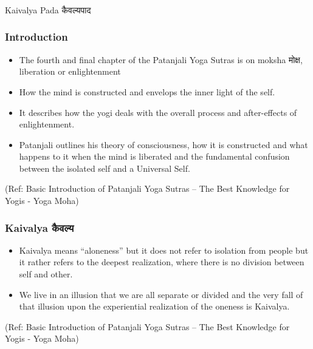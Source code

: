 \begin{frame}[fragile]\frametitle{}
\begin{center}
{\Large Kaivalya Pada कैवल्यपाद}
\end{center}
\end{frame}



\begin{frame}[fragile]\frametitle{Introduction}


	\begin{itemize}
	\item The fourth and final chapter of the Patanjali Yoga Sutras is on moksha मोक्ष, liberation or enlightenment
	\item How the mind is constructed and envelops the inner light of the self. 
	\item It describes how the yogi deals with the overall process and after-effects of enlightenment. 	\item Patanjali outlines his theory of consciousness, how it is constructed and what happens to it when the mind is liberated and the fundamental confusion between the isolated self and a Universal Self.
	\end{itemize}

\tiny{(Ref: Basic Introduction of Patanjali Yoga Sutras – The Best Knowledge for Yogis - Yoga Moha)}

\end{frame}

\begin{frame}[fragile]\frametitle{Kaivalya कैवल्य}


	\begin{itemize}
	\item Kaivalya means ``aloneness'' but it does not refer to isolation from people but it rather refers to the deepest realization, where there is no division between self and other.
	\item We live in an illusion that we are all separate or divided and the very fall of that illusion upon the experiential realization of the oneness is Kaivalya.
	\end{itemize}

\tiny{(Ref: Basic Introduction of Patanjali Yoga Sutras – The Best Knowledge for Yogis - Yoga Moha)}

\end{frame}